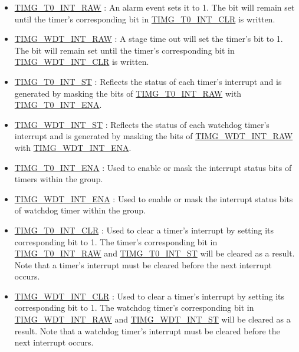\documentclass[main\_\_EN.tex]{subfiles}
\begin{document}
\begin{itemize}
\item \hyperref[fielddesc:TIMGT0INTRAW]{TIMG\_T0\_INT\_RAW} :
An alarm event sets it to 1. The bit will remain set until the timer's corresponding bit in \hyperref[fielddesc:TIMGT0INTCLR]{TIMG\_T0\_INT\_CLR} is written.
\item \hyperref[fielddesc:TIMGWDTINTRAW]{TIMG\_WDT\_INT\_RAW} : A stage time out will set the timer's bit to 1. The bit will remain set until the timer's corresponding bit in \hyperref[fielddesc:TIMGWDTINTCLR]{TIMG\_WDT\_INT\_CLR} is written.
\item \hyperref[fielddesc:TIMGT0INTST]{TIMG\_T0\_INT\_ST} : Reflects the status of each timer's interrupt and is generated by masking the bits of \hyperref[fielddesc:TIMGT0INTRAW]{TIMG\_T0\_INT\_RAW} with \hyperref[fielddesc:TIMGT0INTENA]{TIMG\_T0\_INT\_ENA}.
\item \hyperref[fielddesc:TIMGWDTINTST]{TIMG\_WDT\_INT\_ST} : Reflects the status of each watchdog timer's interrupt and is generated by masking the bits of \hyperref[fielddesc:TIMGWDTINTRAW]{TIMG\_WDT\_INT\_RAW} with \hyperref[fielddesc:TIMGWDTINTENA]{TIMG\_WDT\_INT\_ENA}.
\item \hyperref[fielddesc:TIMGT0INTENA]{TIMG\_T0\_INT\_ENA} : Used to enable or mask the interrupt status bits of timers within the group.
\item \hyperref[fielddesc:TIMGWDTINTENA]{TIMG\_WDT\_INT\_ENA} : Used to enable or mask the interrupt status bits of watchdog timer within the group.
\item \hyperref[fielddesc:TIMGT0INTCLR]{TIMG\_T0\_INT\_CLR} : Used to clear a timer's interrupt by setting its corresponding bit to 1. The timer's corresponding bit in \hyperref[fielddesc:TIMGT0INTRAW]{TIMG\_T0\_INT\_RAW} and \hyperref[fielddesc:TIMGT0INTST]{TIMG\_T0\_INT\_ST} will be cleared as a result. Note that a timer's interrupt must be cleared before the next interrupt occurs.
\item \hyperref[fielddesc:TIMGWDTINTCLR]{TIMG\_WDT\_INT\_CLR} : Used to clear a timer's interrupt by setting its corresponding bit to 1. The watchdog timer's corresponding bit in \hyperref[fielddesc:TIMGWDTINTRAW]{TIMG\_WDT\_INT\_RAW} and \hyperref[fielddesc:TIMGWDTINTST]{TIMG\_WDT\_INT\_ST} will be cleared as a result. Note that a watchdog timer's interrupt must be cleared before the next interrupt occurs.
\end{itemize}
\end{document}
